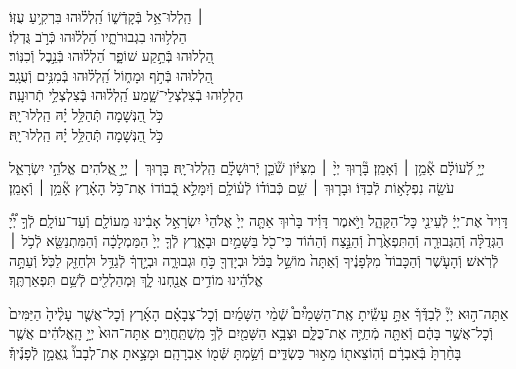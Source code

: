 \documentclass[twoside, openany, parskip=half, 11pt]{book}
\begin{document}
\begin{narrow}
 ׀ \hfill \break
הַֽלְלוּ־אֵ֥ל בְּֿקָדְֿשׁ֑וֹ \hfill הַֽ֝לְל֗וּהוּ בִּרְקִ֥יעַ עֻזּֽוֹ׃ \\
הַלְל֥וּהוּ בִגְבוּרֹתָ֑יו \hfill הַ֝לְל֗וּהוּ כְּֿרֹ֣ב גֻּדְלֽוֹ׃ \\
הַ֭לְלוּהוּ בְּֿתֵ֣קַע שׁוֹפָ֑ר \hfill הַ֝לְל֗וּהוּ בְּֿנֵ֣בֶל וְֿכִנּֽוֹר׃ \\
הַ֭לְלוּהוּ בְּֿתֹ֣ף וּמָח֑וֹל \hfill הַֽ֝לְל֗וּהוּ בְּֿמִנִּ֥ים וְֿעֻגָֽב׃ \\
הַלְל֥וּהוּ בְֿצִלְצְלֵי־שָׁ֑מַע \hfill הַֽ֝לְל֗וּהוּ בְּֽֿצִלְצְלֵ֥י תְֿרוּעָֽה׃ \\
כֹּ֣ל הַ֭נְּשָׁמָה תְּֿהַלֵּ֥ל יָ֗הּ \hfill הַֽלְלוּ־יָֽהּ׃ \\
\scriptsize{כֹּ֣ל הַ֭נְּשָׁמָה תְּֿהַלֵּ֥ל יָ֗הּ \hfill הַֽלְלוּ־יָֽהּ׃ \\}
\normalsize{}

\end{narrow}

\negline

יְיָ֥ לְֿ֝עוֹלָ֗ם אָ֘מֵ֥ן ׀ וְֿאָמֵֽן׃ \hfill \break
{}בָּ֘ר֤וּךְ יְיָ֨ ׀ מִצִּיּ֗וֹן שֹׁ֘כֵ֤ן יְֽֿרוּשָׁלָ֗‍ִם הַֽלְלוּ־יָֽהּ׃ \hfill \break
{}בָּר֤וּךְ ׀ יְיָ֣ אֱ֭לֹהִים אֱלֹהֵ֣י יִשְׂרָאֵ֑ל עֹשֵׂ֖ה נִפְלָא֣וֹת לְֿבַדּֽוֹ׃ \hfill \break
וּבָר֤וּךְ ׀ שֵׁ֥ם כְּֿבוֹד֗וֹ לְֿע֫וֹלָ֥ם וְֿיִמָּלֵ֣א כְֿ֭בוֹדוֹ אֶת־כֹּ֥ל הָאָ֗רֶץ אָ֘מֵ֥ן ׀ וְֿאָמֵֽן׃





דָּוִיד֙ אֶת־יְיָ֔ לְֿעֵינֵ֖י כׇּל־הַקָּהָ֑ל וַיֹּ֣אמֶר דָּוִ֗יד בָּר֨וּךְ אַתָּ֤ה יְיָ֙ אֱלֹהֵי֙ יִשְׂרָאֵ֣ל אָבִ֔ינוּ מֵעוֹלָ֖ם וְֿעַד־עוֹלָֽם׃
לְֿךָ֣ יְ֠יָ֠ הַגְּדֻלָּ֨ה וְֿהַגְּבוּרָ֤ה וְֿהַתִּפְאֶ֙רֶת֙ וְֿהַנֵּ֣צַח וְֿהַה֔וֹד כִּי־כֹ֖ל בַּשָּׁמַ֣יִם וּבָאָ֑רֶץ לְֿךָ֤ יְיָ֙ הַמַּמְלָכָ֔ה וְֿהַמִּתְנַשֵּׂ֖א לְֿכֹ֥ל ׀ לְֿרֹֽאשׁ׃
וְֿהָעֹ֤שֶׁר וְֿהַכָּבוֹד֙ מִלְּפָנֶ֔יךָ וְֿאַתָּה֙ מוֹשֵׁ֣ל בַּכֹּ֔ל וּבְיָדְךָ֖ כֹּ֣חַ וּגְבוּרָ֑ה וּבְיָ֣דְךָ֔ לְֿגַדֵּ֥ל וּלְחַזֵּ֖ק לַכֹּֽל׃
וְֿעַתָּ֣ה אֱלֹהֵ֔ינוּ מוֹדִ֥ים אֲנַ֖חְנוּ לָ֑ךְ וּֽמְהַלְלִ֖ים לְֿשֵׁ֥ם תִּפְאַרְתֶּֽךָ׃



אַתָּה־ה֣וּא
יְיָ֘ לְֿבַדֶּ֒ךָ֒ אַתָּ֣ עָשִֽׂ֡יתָ אֶֽת־הַשָּׁמַ֩יִם֩ שְֿׁמֵ֨י הַשָּׁמַ֜יִם וְֿכׇל־צְבָאָ֗ם הָאָ֜רֶץ וְֿכׇל־אֲשֶׁ֤ר עָלֶ֨יהָ֙ הַיַּמִּים֙ וְֿכׇל־אֲשֶׁ֣ר בָּהֶ֔ם וְֿאַתָּ֖ה מְֿחַיֶּ֣ה אֶת־כֻּלָּ֑ם וּצְבָ֥א הַשָּׁמַ֖יִם לְֿךָ֥ מִֽשְׁתַּֽחֲוִֽים׃
אַתָּה־הוּא֙ יְיָ֣ הָֽאֱלֹהִ֔ים אֲשֶׁ֤ר בָּחַ֨רְתָּ֙ בְּֿאַבְרָ֔ם וְֿהֽוֹצֵאת֖וֹ מֵא֣וּר כַּשְׂדִּ֑ים וְֿשַׂ֥מְתָּ שְּֿׁמ֖וֹ אַבְרָהָֽם׃ וּמָצָ֣אתָ אֶת־לְבָבוֹ֘ נֶֽאֱמָ֣ן לְֿפָנֶ֒יךָ֒׃
\end{document}
